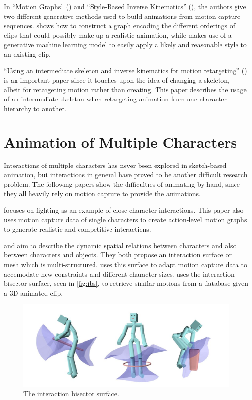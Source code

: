 In ``Motion Graphs'' (\citep{kovar2002motion}) and ``Style-Based Inverse Kinematics'' (\citep{grochow2004style}), the authors give two different generative methods used to build animations from motion capture sequences. \citep{kovar2002motion} shows how to construct a graph encoding the different orderings of clips that could possibly make up a realistic animation, while \citep{grochow2004style} makes use of a generative machine learning model to easily apply a likely and reasonable style to an existing clip.

``Using an intermediate skeleton and inverse kinematics for motion retargeting'' (\citep{monzani2000using}) is an important paper since it touches upon the idea of changing a skeleton, albeit for retargeting motion rather than creating. This paper describes the usage of an intermediate skeleton when retargeting animation from one character hierarchy to another.

\section{Animation of Multiple Characters}
Interactions of multiple characters has never been explored in sketch-based animation, but interactions in general have proved to be another difficult research problem. The following papers show the difficulties of animating by hand, since they all heavily rely on motion capture to provide the animations.

\citep{shum2007simulating} focuses on fighting as an example of close character interactions. This paper also uses motion capture data of single characters to create action-level motion graphs to generate realistic and competitive interactions.
  
\citep{ho2014multi} and \citep{zhao2017character} aim to describe the dynamic spatial relations between characters and also between characters and objects. They both propose an interaction surface or mesh which is multi-structured. \citep{ho2014multi} uses this surface to adapt motion capture data to accomodate new constraints and different character sizes. \citep{zhao2017character} uses the interaction bisector surface, seen in \autoref{fig:ibs}, to retrieve similar motions from a database given a 3D animated clip.

\begin{figure}[!h]
\centering
\includegraphics[scale=0.5]{img/ibs}
\caption{The interaction bisector surface.}
\label{fig:ibs}
\end{figure}


